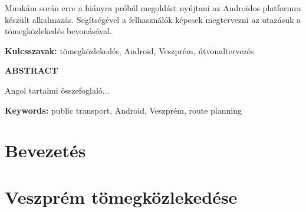 \documentclass[a4paper,oneside,10pt]{report}
\begin{document}
Munkám során erre a hiányra próbál megoldást nyújtani az Androidos platformra készült alkalmazás.
Segítségével a felhasználók képesek megtervezni az utazásuk a tömegközlekedés bevonásával.

\textbf{Kulcsszavak:} tömegközlekedés, Android, Veszprém, útvonaltervezés

\newpage

\Large
\begin{center}
	\textbf{ABSTRACT}
\end{center}
\normalsize
\noindent
Angol tartalmi összefoglaló...

\textbf{Keywords:} public transport, Android, Veszprém, route planning
\tableofcontents
\newpage
\listoffigures
\newpage






\pagestyle{plain} %







\chapter{Bevezetés}
\label{bev}


\chapter{Veszprém tömegközlekedése}
\label{tom}

\end{document}
